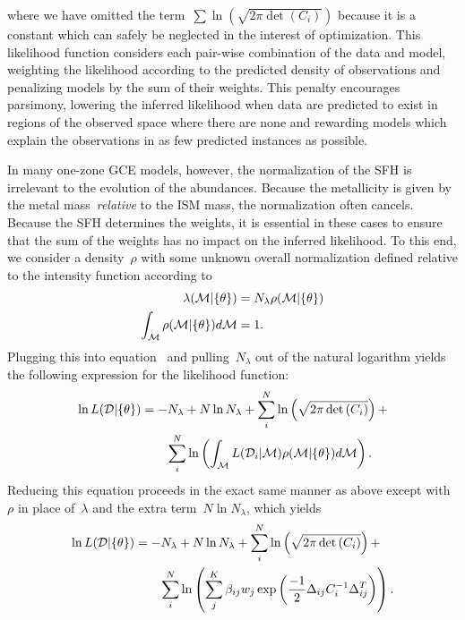 \documentclass[ms.tex]{subfiles}
\begin{document}
where we have omitted the term~$\sum \ln \left(\sqrt{2\pi \det{(C_i)}}\right)$
because it is a constant which can safely be neglected in the interest of
optimization.
This likelihood function considers each pair-wise combination of the data and
model, weighting the likelihood according to the predicted density of
observations and penalizing models by the sum of their weights.
This penalty encourages parsimony, lowering the inferred likelihood when data
are predicted to exist in regions of the observed space where there are none
and rewarding models which explain the observations in as few predicted
instances as possible.
\par
In many one-zone GCE models, however, the normalization of the SFH is
irrelevant to the evolution of the abundances.
Because the metallicity is given by the metal mass~\textit{relative} to the ISM
mass, the normalization often cancels.
Because the SFH determines the weights, it is essential in these cases to
ensure that the sum of the weights has no impact on the inferred likelihood.
To this end, we consider a density~$\rho$ with some unknown overall
normalization defined relative to the intensity function according to
\begin{subequations}\begin{align}
\lambda(\mathcal{M} | \{\theta\}) &= N_\lambda \rho(\mathcal{M} | \{\theta\})
\\
\int_{\mathcal{M}} \rho(\mathcal{M} | \{\theta\}) d\mathcal{M} &= 1.
\end{align}\end{subequations}
Plugging this into equation~ and pulling~$N_\lambda$
out of the natural logarithm yields the following expression for the likelihood
function:
\begin{equation}\begin{split}
\ln L(\mathcal{D} | \{\theta\}) &= -N_\lambda + N \ln N_\lambda +
\sum_i^N \ln \left(\sqrt{2\pi \det{(C_i)}}\right) +
\\
&\qquad \sum_i^N \ln \left(
\int_{\mathcal{M}} L(\mathcal{D}_i | \mathcal{M}) \rho(\mathcal{M} | \{\theta\})
d\mathcal{M} \right).
\end{split}\end{equation}
Reducing this equation proceeds in the exact same manner as above except with
$\rho$ in place of~$\lambda$ and the extra term~$N \ln N_\lambda$, which
yields
\begin{equation}\begin{split}
\ln L(\mathcal{D} | \{\theta\}) &= -N_\lambda + N \ln N_\lambda +
\sum_i^N \ln \left(\sqrt{2\pi \det{(C_i)}}\right) +
\\
&\qquad \sum_i^N \ln \left(
\sum_j^K \beta_{ij} w_j
\exp\left(\frac{-1}{2}\Delta_{ij} C_i^{-1} \Delta_{ij}^T\right)\right).
\end{split}\end{equation}
\end{document}
